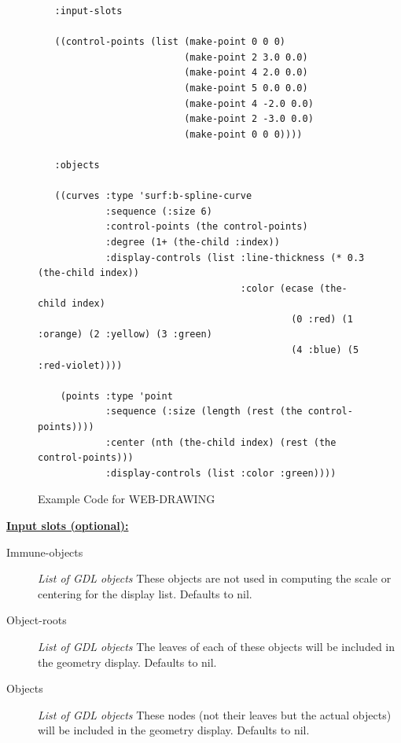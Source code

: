 \documentclass [11pt]{book}
\begin{document}
\begin{itemize}
\begin{figure}
\begin{lrbox}{\boxedverb}
\begin{minipage}{\linewidth}
{\begin{verbatim}
   :input-slots

   ((control-points (list (make-point 0 0 0)
                          (make-point 2 3.0 0.0) 
                          (make-point 4 2.0 0.0) 
                          (make-point 5 0.0 0.0) 
                          (make-point 4 -2.0 0.0) 
                          (make-point 2 -3.0 0.0) 
                          (make-point 0 0 0))))
  
   :objects

   ((curves :type 'surf:b-spline-curve
            :sequence (:size 6)
            :control-points (the control-points)
            :degree (1+ (the-child :index))
            :display-controls (list :line-thickness (* 0.3 (the-child index))
                                    :color (ecase (the-child index)
                                             (0 :red) (1 :orange) (2 :yellow) (3 :green)
                                             (4 :blue) (5 :red-violet))))

    (points :type 'point 
            :sequence (:size (length (rest (the control-points))))
            :center (nth (the-child index) (rest (the control-points)))
            :display-controls (list :color :green))))

\end{verbatim}}
\end{minipage}
\end{lrbox}
\fbox{\usebox{\boxedverb}}

\caption{Example Code for WEB-DRAWING}

\label{fig:example-code-WEB-DRAWING}

\end{figure}





\textbf{
\underline{Input slots (optional):}}

\begin{description}

\item [Immune-objects]
\emph{List of GDL objects} These objects are not used in computing the scale or centering for the display list. Defaults to nil.


\item [Object-roots]
\emph{List of GDL objects} The leaves of each of these objects will be included in the geometry display. Defaults to nil.


\item [Objects]
\emph{List of GDL objects} These nodes (not their leaves but the actual objects) will be included in the geometry display. Defaults to nil.



\end{description}
\end{itemize}
\end{document}

